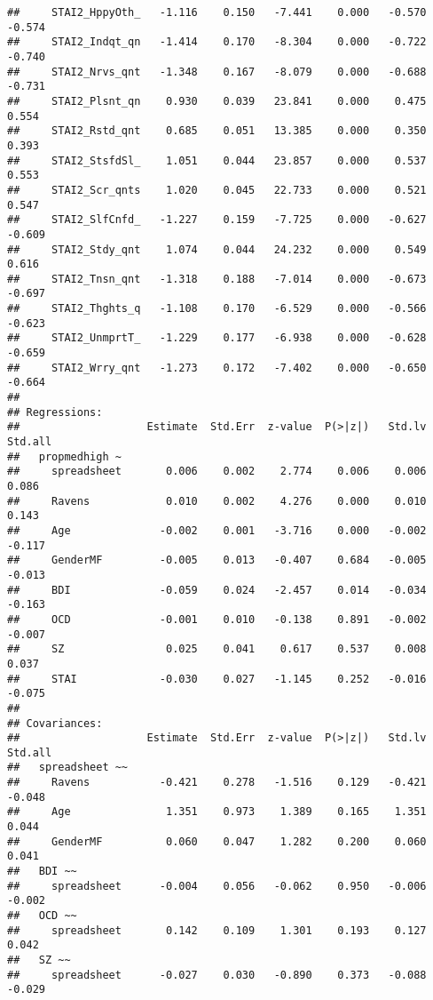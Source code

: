 \documentclass[]{article}
\begin{document}
\begin{verbatim}
##     STAI2_HppyOth_   -1.116    0.150   -7.441    0.000   -0.570   -0.574
##     STAI2_Indqt_qn   -1.414    0.170   -8.304    0.000   -0.722   -0.740
##     STAI2_Nrvs_qnt   -1.348    0.167   -8.079    0.000   -0.688   -0.731
##     STAI2_Plsnt_qn    0.930    0.039   23.841    0.000    0.475    0.554
##     STAI2_Rstd_qnt    0.685    0.051   13.385    0.000    0.350    0.393
##     STAI2_StsfdSl_    1.051    0.044   23.857    0.000    0.537    0.553
##     STAI2_Scr_qnts    1.020    0.045   22.733    0.000    0.521    0.547
##     STAI2_SlfCnfd_   -1.227    0.159   -7.725    0.000   -0.627   -0.609
##     STAI2_Stdy_qnt    1.074    0.044   24.232    0.000    0.549    0.616
##     STAI2_Tnsn_qnt   -1.318    0.188   -7.014    0.000   -0.673   -0.697
##     STAI2_Thghts_q   -1.108    0.170   -6.529    0.000   -0.566   -0.623
##     STAI2_UnmprtT_   -1.229    0.177   -6.938    0.000   -0.628   -0.659
##     STAI2_Wrry_qnt   -1.273    0.172   -7.402    0.000   -0.650   -0.664
## 
## Regressions:
##                    Estimate  Std.Err  z-value  P(>|z|)   Std.lv  Std.all
##   propmedhigh ~                                                         
##     spreadsheet       0.006    0.002    2.774    0.006    0.006    0.086
##     Ravens            0.010    0.002    4.276    0.000    0.010    0.143
##     Age              -0.002    0.001   -3.716    0.000   -0.002   -0.117
##     GenderMF         -0.005    0.013   -0.407    0.684   -0.005   -0.013
##     BDI              -0.059    0.024   -2.457    0.014   -0.034   -0.163
##     OCD              -0.001    0.010   -0.138    0.891   -0.002   -0.007
##     SZ                0.025    0.041    0.617    0.537    0.008    0.037
##     STAI             -0.030    0.027   -1.145    0.252   -0.016   -0.075
## 
## Covariances:
##                    Estimate  Std.Err  z-value  P(>|z|)   Std.lv  Std.all
##   spreadsheet ~~                                                        
##     Ravens           -0.421    0.278   -1.516    0.129   -0.421   -0.048
##     Age               1.351    0.973    1.389    0.165    1.351    0.044
##     GenderMF          0.060    0.047    1.282    0.200    0.060    0.041
##   BDI ~~                                                                
##     spreadsheet      -0.004    0.056   -0.062    0.950   -0.006   -0.002
##   OCD ~~                                                                
##     spreadsheet       0.142    0.109    1.301    0.193    0.127    0.042
##   SZ ~~                                                                 
##     spreadsheet      -0.027    0.030   -0.890    0.373   -0.088   -0.029

\end{verbatim}
\end{document}
